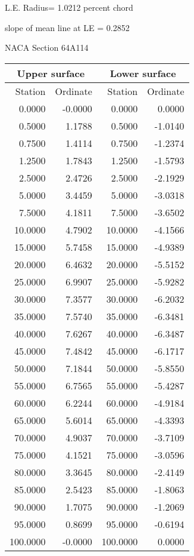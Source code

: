 \documentclass[11pt]{book}
\begin{document}
L.E. Radius=  1.0212 percent chord


 slope of mean line at LE =  0.2852
 \newpage
  \label{s64A114}
 \begin{Large}
 NACA Section 64A114
 \end{Large}
  
 \vspace{8mm}
 \begin{tabular}{|r|r|r|r|} \hline 
 \multicolumn{2}{|c|}{Upper surface} & \multicolumn{2}{|c|}{Lower surface} \\
 \hline
 Station & Ordinate & Station & Ordinate \\
 \hline
0.0000 & -0.0000 & 0.0000 & 0.0000 \\
0.5000 & 1.1788 & 0.5000 & -1.0140 \\
0.7500 & 1.4114 & 0.7500 & -1.2374 \\
1.2500 & 1.7843 & 1.2500 & -1.5793 \\
2.5000 & 2.4726 & 2.5000 & -2.1929 \\
5.0000 & 3.4459 & 5.0000 & -3.0318 \\
7.5000 & 4.1811 & 7.5000 & -3.6502 \\
10.0000 & 4.7902 & 10.0000 & -4.1566 \\
15.0000 & 5.7458 & 15.0000 & -4.9389 \\
20.0000 & 6.4632 & 20.0000 & -5.5152 \\
25.0000 & 6.9907 & 25.0000 & -5.9282 \\
30.0000 & 7.3577 & 30.0000 & -6.2032 \\
35.0000 & 7.5740 & 35.0000 & -6.3481 \\
40.0000 & 7.6267 & 40.0000 & -6.3487 \\
45.0000 & 7.4842 & 45.0000 & -6.1717 \\
50.0000 & 7.1844 & 50.0000 & -5.8550 \\
55.0000 & 6.7565 & 55.0000 & -5.4287 \\
60.0000 & 6.2244 & 60.0000 & -4.9184 \\
65.0000 & 5.6014 & 65.0000 & -4.3393 \\
70.0000 & 4.9037 & 70.0000 & -3.7109 \\
75.0000 & 4.1521 & 75.0000 & -3.0596 \\
80.0000 & 3.3645 & 80.0000 & -2.4149 \\
85.0000 & 2.5423 & 85.0000 & -1.8063 \\
90.0000 & 1.7075 & 90.0000 & -1.2069 \\
95.0000 & 0.8699 & 95.0000 & -0.6194 \\
100.0000 & -0.0000 & 100.0000 & 0.0000 \\
 \hline 
 \end{tabular}
\end{document}
